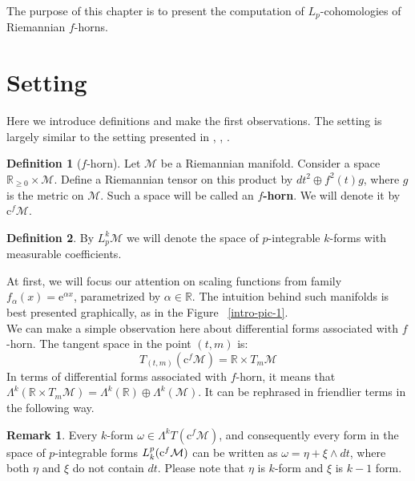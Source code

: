 \documentclass[licencjacka]{pracamgr}
\theoremstyle{definition}
\newtheorem{definition}{Definition}[section]
\theoremstyle{definition}
\newtheorem{remark}{Remark}[section]
\theoremstyle{plain}
\theoremstyle{plain}
\def\cfm{\ensuremath\mathrm{c}^f\mathcal{M}}
\begin{document}
The purpose of this chapter is to present the computation of
$L_p$-cohomologies of Riemannian $f$-horns.



\section{Setting}
Here we introduce definitions and make the first observations. The setting
is largely similar to the setting presented in \cite{weber}, \cite{youssin},
\cite{cheeger}. \\

\begin{definition}[$f$-horn]
Let $\mathcal{M}$ be a Riemannian manifold. Consider a space $
\mathbb{R}_{\geq 0} \times \mathcal{M}$.  Define a Riemannian tensor
on this product by $dt^2 \oplus f^{2}(t)g $, where $g$ is the metric
on $\mathcal{M}$.  Such a space will be called an
\textbf{$f$-horn}. We will denote it by $\mathrm{c}^f \mathcal{M}$. \\
\end{definition}

\begin{definition}
  By $L_p^k \mathcal{M}$ we will denote the space of $p$-integrable
  $k$-forms with measurable coefficients.
\end{definition}

At first, we will focus our attention on scaling functions from family
$f_\alpha(x) = \mathrm{e}^{\alpha x}$, parametrized by $\alpha \in
\mathbb{R}$.  The intuition behind such manifolds is best presented
graphically, as in the Figure ~\ref{intro-pic-1}. \\


We can make a simple observation here about differential forms
associated with $f$-horn. The tangent space in the point $(t, m)$ is:
\[
    T_{(t, m)} (\mathrm{c}^f \mathcal{M}) = \mathbb{R} \times T_m \mathcal{M}
\]
In terms of differential forms associated with $f$-horn, it means that
$\Lambda^k(\mathbb{R} \times T_m \mathcal{M}) = 
\Lambda^k(\mathbb{R})  \oplus \Lambda^k(\mathcal{M}) $.
It can be rephrased in friendlier terms in the following way.

\begin{remark}
Every $k$-form $\omega \in \Lambda^k T(\mathrm{c}^f \mathcal{M})$, and
consequently every form in the space of $p$-integrable forms $L_k^p
(\cfm)$ can be written as $\omega = \eta + \xi
\wedge dt$, where both $\eta$ and $\xi$ do not contain $dt$.  Please
note that $\eta$ is $k$-form and $\xi$ is $k-1$ form.
\end{remark}
\end{document}
